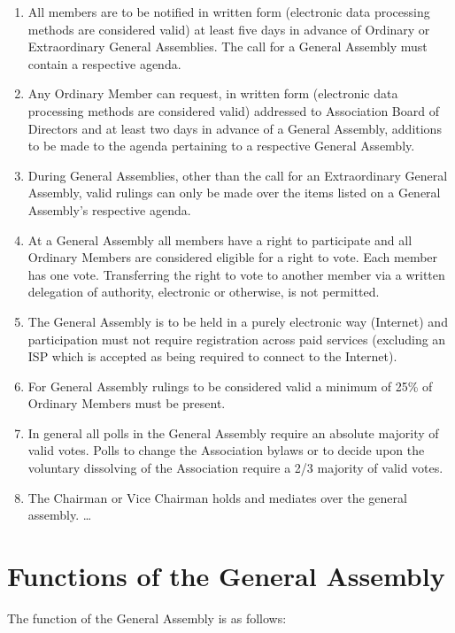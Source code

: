 \begin{enumerate}
\item All members are to be notified in written form (electronic data processing methods are considered valid) at least five days in advance of Ordinary or Extraordinary General Assemblies. The call for a General Assembly must contain a respective agenda.
\item Any Ordinary Member can request, in written form (electronic data processing methods are considered valid) addressed to Association Board of Directors and at least two days in advance of a General Assembly, additions to be made to the agenda pertaining to a respective General Assembly.
\item During General Assemblies, other than the call for an Extraordinary General Assembly, valid rulings can only be made over the items listed on a General Assembly’s respective agenda.
\item At a General Assembly all members have a right to participate and all Ordinary Members are considered eligible for a right to vote. Each member has one vote. Transferring the right to vote to another member via a written delegation of authority, electronic or otherwise, is not permitted.
\item The General Assembly is to be held in a purely electronic way (Internet) and participation must not require registration across paid services (excluding an ISP which is accepted as being required to connect to the Internet).
\item For General Assembly rulings to be considered valid a minimum of 25\% of Ordinary Members must be present.
\item In general all polls in the General Assembly require an absolute majority of valid votes. Polls to change the Association bylaws or to decide upon the voluntary dissolving of the Association require a 2/3 majority of valid votes.
\item The Chairman or Vice Chairman holds and mediates over the general assembly.
 \ldots
\end{enumerate}




\section{Functions of the General Assembly}

The function of the General Assembly is as follows:


